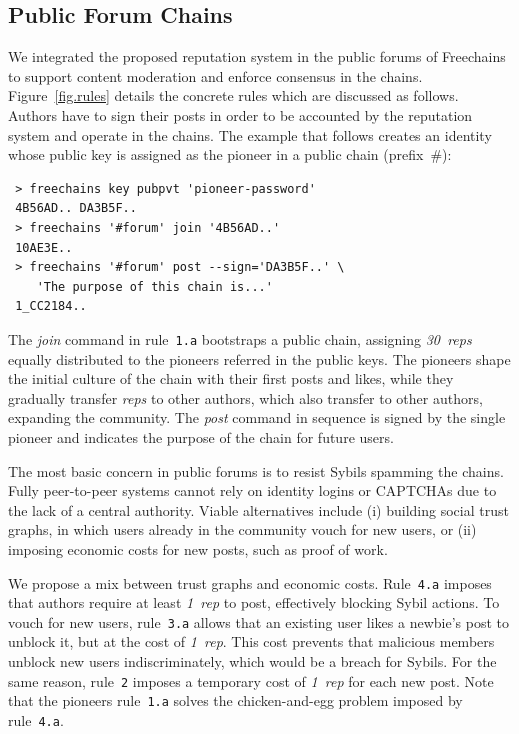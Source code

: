 \documentclass[10pt,journal,compsoc]{IEEEtran}
\newcommand{\FC}       {Freechains\xspace}
\newcommand{\reps}     {\emph{reps}\xspace}
\newcommand{\onerep}   {\emph{1~rep}\xspace}
\newcommand{\nreps}[1] {\emph{#1~reps\xspace}}
\begin{document}
\subsection{Public Forum Chains}
\label{sec.consensus.chains}

We integrated the proposed reputation system in the public forums of \FC to
support content moderation and enforce consensus in the chains.
Figure~\ref{fig.rules} details the concrete rules which are discussed as
follows.
Authors have to sign their posts in order to be accounted by the reputation
system and operate in the chains.
The example that follows creates an identity whose public key is assigned as
the pioneer in a public chain (prefix~$\#$):

{\footnotesize
\begin{verbatim}
 > freechains key pubpvt 'pioneer-password'
 4B56AD.. DA3B5F..
 > freechains '#forum' join '4B56AD..'
 10AE3E..
 > freechains '#forum' post --sign='DA3B5F..' \
    'The purpose of this chain is...'
 1_CC2184..
\end{verbatim}
}

The \emph{join} command in rule~\texttt{1.a} bootstraps a public chain,
assigning \nreps{30} equally distributed to the pioneers referred in the public
keys.
The pioneers shape the initial culture of the chain with their first posts and
likes, while they gradually transfer \reps to other authors, which also
transfer to other authors, expanding the community.
%
The \emph{post} command in sequence is signed by the single pioneer and
indicates the purpose of the chain for future users.

The most basic concern in public forums is to resist Sybils spamming the
chains.
Fully peer-to-peer systems cannot rely on identity logins or CAPTCHAs due
to the lack of a central authority.
Viable alternatives include (i) building social trust graphs, in which users
already in the community vouch for new users, or (ii) imposing economic costs
for new posts, such as proof of work.

We propose a mix between trust graphs and economic costs.
%
Rule~\texttt{4.a} imposes that authors require at least \onerep to post,
effectively blocking Sybil actions.
To vouch for new users, rule~\texttt{3.a} allows that an existing user likes a
newbie's post to unblock it, but at the cost of \onerep.
This cost prevents that malicious members unblock new users indiscriminately,
which would be a breach for Sybils.
For the same reason, rule~\texttt{2} imposes a temporary cost of \onerep for
each new post.
%
Note that the pioneers rule~\texttt{1.a} solves the chicken-and-egg problem
imposed by rule~\texttt{4.a}.
\end{document}
